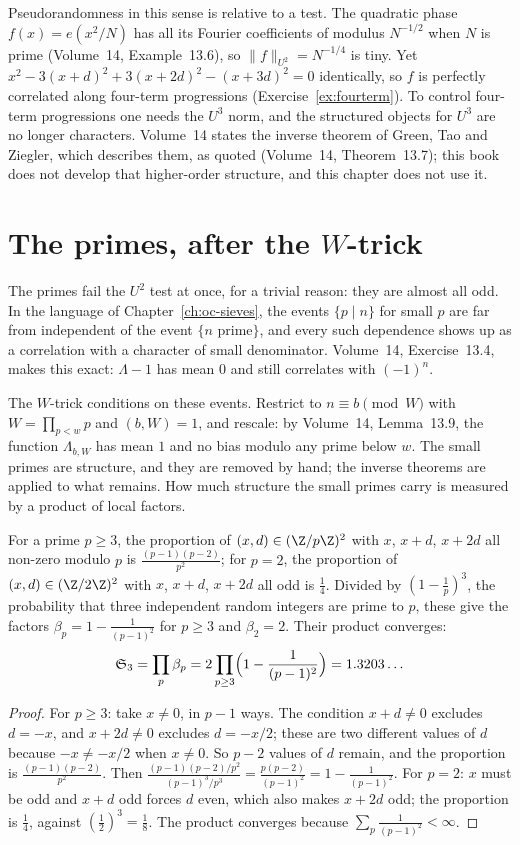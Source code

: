 Pseudorandomness in this sense is relative to a test. The quadratic phase $f(x)=e(x^2/N)$ has all its Fourier coefficients of modulus $N^{-1/2}$ when $N$ is prime (Volume~14, Example~13.6), so $\|f\|_{U^2}=N^{-1/4}$ is tiny. Yet $x^2-3(x+d)^2+3(x+2d)^2-(x+3d)^2=0$ identically, so $f$ is perfectly correlated along four-term progressions (Exercise~\ref{ex:fourterm}). To control four-term progressions one needs the $U^3$ norm, and the structured objects for $U^3$ are no longer characters. Volume~14 states the inverse theorem of Green, Tao and Ziegler, which describes them, as quoted (Volume~14, Theorem~13.7); this book does not develop that higher-order structure, and this chapter does not use it.

\section{The primes, after the $W$-trick}\label{sec:wtrick}

The primes fail the $U^2$ test at once, for a trivial reason: they are almost all odd. In the language of Chapter~\ref{ch:oc-sieves}, the events $\{p\mid n\}$ for small $p$ are far from independent of the event $\{n\text{ prime}\}$, and every such dependence shows up as a correlation with a character of small denominator. Volume~14, Exercise~13.4, makes this exact: $\Lambda-1$ has mean $0$ and still correlates with $(-1)^n$.

The $W$-trick conditions on these events. Restrict to $n\equiv b\pmod W$ with $W=\prod_{p<w}p$ and $(b,W)=1$, and rescale: by Volume~14, Lemma~13.9, the function $\Lambda_{b,W}$ has mean $1$ and no bias modulo any prime below $w$. The small primes are structure, and they are removed by hand; the inverse theorems are applied to what remains. How much structure the small primes carry is measured by a product of local factors.

\begin{proposition}\label{prop:local3}
For a prime $p\ge3$, the proportion of $(x,d)\in(\Z/p\Z)^2$ with $x$, $x+d$, $x+2d$ all non-zero modulo $p$ is $\frac{(p-1)(p-2)}{p^2}$; for $p=2$, the proportion of $(x,d)\in(\Z/2\Z)^2$ with $x$, $x+d$, $x+2d$ all odd is $\frac14$. Divided by $(1-\frac1p)^3$, the probability that three independent random integers are prime to $p$, these give the factors $\beta_p=1-\frac1{(p-1)^2}$ for $p\ge3$ and $\beta_2=2$. Their product converges:
\[
\mathfrak S_3=\prod_p\beta_p=2\prod_{p\ge3}\Bigl(1-\frac1{(p-1)^2}\Bigr)=1.3203\ldots
\]
\end{proposition}
\begin{proof}
For $p\ge3$: take $x\ne0$, in $p-1$ ways. The condition $x+d\ne0$ excludes $d=-x$, and $x+2d\ne0$ excludes $d=-x/2$; these are two different values of $d$ because $-x\ne-x/2$ when $x\ne0$. So $p-2$ values of $d$ remain, and the proportion is $\frac{(p-1)(p-2)}{p^2}$. Then $\frac{(p-1)(p-2)/p^2}{(p-1)^3/p^3}=\frac{p(p-2)}{(p-1)^2}=1-\frac1{(p-1)^2}$. For $p=2$: $x$ must be odd and $x+d$ odd forces $d$ even, which also makes $x+2d$ odd; the proportion is $\frac14$, against $(\frac12)^3=\frac18$. The product converges because $\sum_p\frac1{(p-1)^2}<\infty$.
\end{proof}

